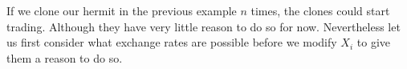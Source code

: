 \begin{example}
	If we clone our hermit in the previous example \(n\) times, the clones could
	start trading. Although they have very little reason to do so for now.
	Nevertheless let us first consider what exchange rates are possible before
	we modify \(X_i\) to give them a reason to do so.
\end{example}
